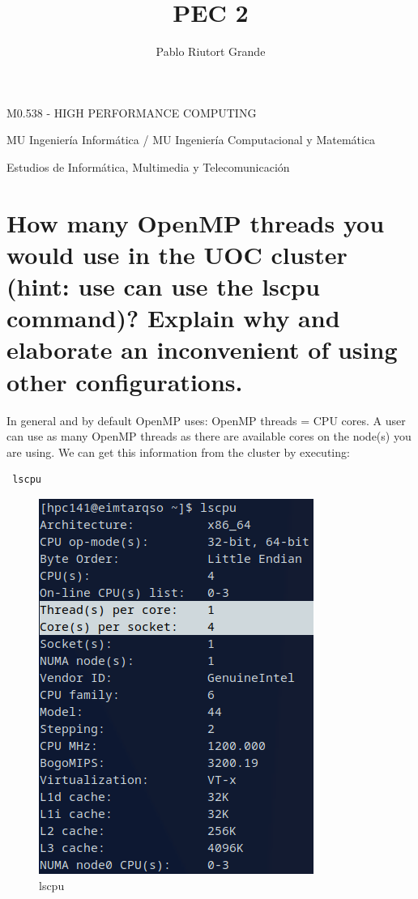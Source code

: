 \documentclass[11pt]{article}
\title{PEC 2}
\begin{document}
    \author{Pablo Riutort Grande}
    \maketitle
  
    
M0.538 - HIGH PERFORMANCE COMPUTING

MU Ingeniería Informática / MU Ingeniería Computacional y Matemática

Estudios de Informática, Multimedia y Telecomunicación


    \newpage


\hypertarget{1}{%
\section{How many OpenMP threads you would use in the UOC cluster (hint: use can use
the lscpu command)? Explain why and elaborate an inconvenient of using other configurations.}\label{1}}

In general and by default OpenMP uses: OpenMP threads = CPU cores. A user can use as many OpenMP threads as there are available cores on the node(s) you are using. We can get this information from the cluster by executing:
\begin{lstlisting}
 lscpu
\end{lstlisting}

\begin{figure}[h!]
    \centering
    \includegraphics{1.png}
    \caption{lscpu}
    \label{fig:1}
\end{figure}
\end{document}
